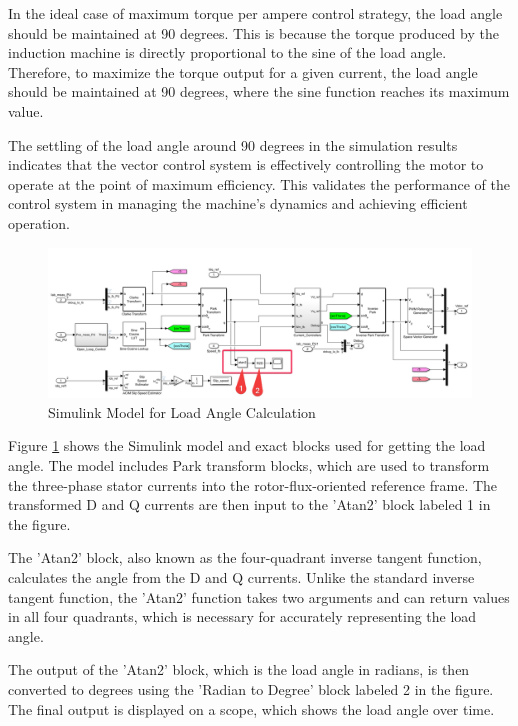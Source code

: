 In the ideal case of maximum torque per ampere control strategy, the load angle should be maintained at 90 degrees. This is because the torque produced by the induction machine is directly proportional to the sine of the load angle. Therefore, to maximize the torque output for a given current, the load angle should be maintained at 90 degrees, where the sine function reaches its maximum value.

The settling of the load angle around 90 degrees in the simulation results indicates that the vector control system is effectively controlling the motor to operate at the point of maximum efficiency. This validates the performance of the control system in managing the machine's dynamics and achieving efficient operation.


\begin{figure}[H]
	\centering
	\includegraphics[width=6in]{sections/section3/images/simulationResutls/howTogetloadAngle.png}
	\caption{Simulink Model for Load Angle Calculation}
	\label{fig:simulink_model}
\end{figure}

Figure \ref{fig:simulink_model} shows the Simulink model and exact blocks used for getting the load angle. The model includes Park transform blocks, which are used to transform the three-phase stator currents into the rotor-flux-oriented reference frame. The transformed D and Q currents are then input to the 'Atan2' block labeled 1 in the figure.

The 'Atan2' block, also known as the four-quadrant inverse tangent function, calculates the angle from the D and Q currents. Unlike the standard inverse tangent function, the 'Atan2' function takes two arguments and can return values in all four quadrants, which is necessary for accurately representing the load angle.

The output of the 'Atan2' block, which is the load angle in radians, is then converted to degrees using the 'Radian to Degree' block labeled 2 in the figure. The final output is displayed on a scope, which shows the load angle over time. 

